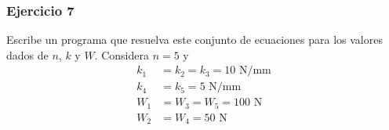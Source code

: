 \begin{frame}
\frametitle{Ejercicio 7}
Escribe un programa que resuelva este conjunto de ecuaciones para los valores dados de $n$, $k$ y $W$. Considera $n = 5$ y 
\begin{align*}
k_{1} &= k_{2} = k_{3} = 10 \mbox{ N/mm} \\
k_{4} &= k_{5} = 5 \mbox{ N/mm} \\
W_{1} &= W_{3} = W_{5} = 100 \mbox{ N} \\
W_{2} &= W_{4} = 50 \mbox{ N}
\end{align*}
\end{frame}
